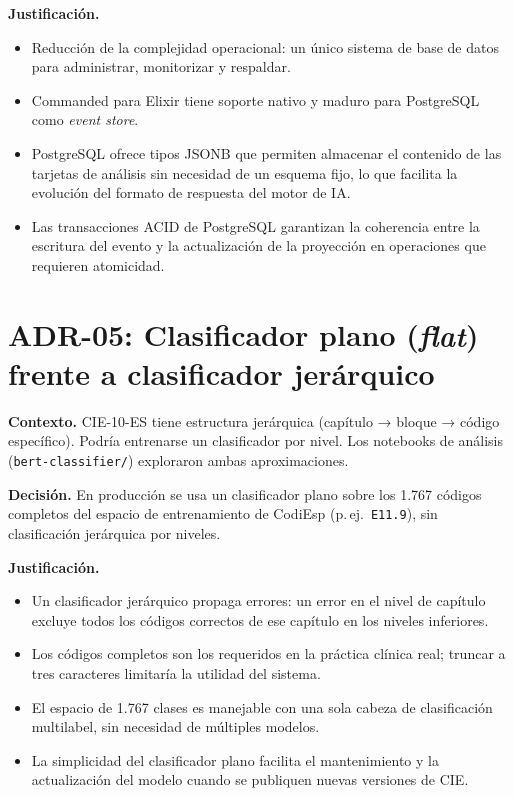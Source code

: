 \textbf{Justificación.}
\begin{itemize}
    \item Reducción de la complejidad operacional: un único sistema de base de datos para administrar, monitorizar y respaldar.
    \item Commanded para Elixir tiene soporte nativo y maduro para PostgreSQL como \emph{event store}.
    \item PostgreSQL ofrece tipos JSONB que permiten almacenar el contenido de las tarjetas de análisis sin necesidad de un esquema fijo, lo que facilita la evolución del formato de respuesta del motor de IA.
    \item Las transacciones ACID de PostgreSQL garantizan la coherencia entre la escritura del evento y la actualización de la proyección en operaciones que requieren atomicidad.
\end{itemize}

\section{ADR-05: Clasificador plano (\emph{flat}) frente a clasificador jerárquico}

\textbf{Contexto.} CIE-10-ES tiene estructura jerárquica (capítulo → bloque → código específico). Podría entrenarse un clasificador por nivel. Los notebooks de análisis (\texttt{bert-classifier/}) exploraron ambas aproximaciones.

\textbf{Decisión.} En producción se usa un clasificador plano sobre los 1.767 códigos completos del espacio de entrenamiento de CodiEsp (p.\,ej.\ \texttt{E11.9}), sin clasificación jerárquica por niveles.

\textbf{Justificación.}
\begin{itemize}
    \item Un clasificador jerárquico propaga errores: un error en el nivel de capítulo excluye todos los códigos correctos de ese capítulo en los niveles inferiores.
    \item Los códigos completos son los requeridos en la práctica clínica real; truncar a tres caracteres limitaría la utilidad del sistema.
    \item El espacio de 1.767 clases es manejable con una sola cabeza de clasificación multilabel, sin necesidad de múltiples modelos.
    \item La simplicidad del clasificador plano facilita el mantenimiento y la actualización del modelo cuando se publiquen nuevas versiones de CIE.
\end{itemize}

